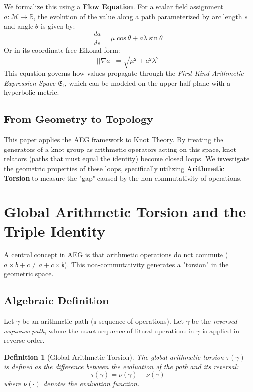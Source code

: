 \documentclass[a4paper,12pt]{article}
\newtheorem{definition}{Definition}[section]
\begin{document}
We formalize this using a \textbf{Flow Equation}. For a scalar field assignment $a: \mathcal{M} \to \mathbb{R}$, the evolution of the value along a path parameterized by arc length $s$ and angle $\theta$ is given by:
\begin{equation}
    \frac{da}{ds} = \mu \cos \theta + a \lambda \sin \theta
\end{equation}
Or in its coordinate-free Eikonal form:
\begin{equation}
    ||\nabla a|| = \sqrt{\mu^2 + a^2 \lambda^2}
\end{equation}
This equation governs how values propagate through the \textit{First Kind Arithmetic Expression Space} $\mathfrak{E}_1$, which can be modeled on the upper half-plane with a hyperbolic metric.

\subsection{From Geometry to Topology}
This paper applies the AEG framework to Knot Theory. By treating the generators of a knot group as arithmetic operators acting on this space, knot relators (paths that must equal the identity) become closed loops. We investigate the geometric properties of these loops, specifically utilizing \textbf{Arithmetic Torsion} to measure the "gap" caused by the non-commutativity of operations.

\section{Global Arithmetic Torsion and the Triple Identity}

A central concept in AEG is that arithmetic operations do not commute ($a \times b + c \neq a + c \times b$). This non-commutativity generates a "torsion" in the geometric space.

\subsection{Algebraic Definition}
Let $\gamma$ be an arithmetic path (a sequence of operations). Let $\bar{\gamma}$ be the \textit{reversed-sequence path}, where the exact sequence of literal operations in $\gamma$ is applied in reverse order.
\begin{definition}[Global Arithmetic Torsion]
The global arithmetic torsion $\tau(\gamma)$ is defined as the difference between the evaluation of the path and its reversal:
\begin{equation}
    \tau(\gamma) = \nu(\gamma) - \nu(\bar{\gamma})
\end{equation}
where $\nu(\cdot)$ denotes the evaluation function.
\end{definition}
\end{document}
